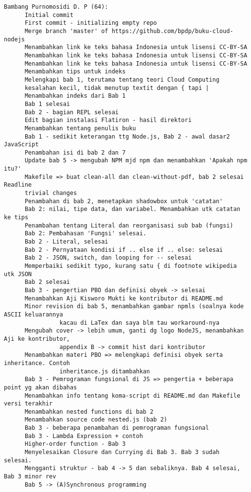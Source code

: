 \begin{lstlisting}
Bambang Purnomosidi D. P (64):
      Initial commit
      First commit - initializing empty repo
      Merge branch 'master' of https://github.com/bpdp/buku-cloud-nodejs
      Menambahkan link ke teks bahasa Indonesia untuk lisensi CC-BY-SA
      Menambahkan link ke teks bahasa Indonesia untuk lisensi CC-BY-SA
      Menambahkan link ke teks bahasa Indonesia untuk lisensi CC-BY-SA
      Menambahkan tips untuk indeks
      Melengkapi bab 1, terutama tentang teori Cloud Computing
      kesalahan kecil, tidak menutup textit dengan { tapi |
      Menambahkan indeks dari Bab 1
      Bab 1 selesai
      Bab 2 - bagian REPL selesai
      Edit bagian instalasi Flatiron - hasil direktori
      Menambahkan tentang penulis buku
      Bab 1 - sedikit keterangan ttg Node.js, Bab 2 - awal dasar2 JavaScript
      Penambahan isi di bab 2 dan 7
      Update bab 5 -> mengubah NPM mjd npm dan menambahkan 'Apakah npm itu?'
      Makefile => buat clean-all dan clean-without-pdf, bab 2 selesai Readline
      trivial changes
      Penambahan di bab 2, menetapkan shadowbox untuk 'catatan'
      Bab 2: nilai, tipe data, dan variabel. Menambahkan utk catatan ke tips
      Penambahan tentang Literal dan reorganisasi sub bab (fungsi)
      Bab 2: Pembahasan 'Fungsi' selesai.
      Bab 2 - Literal, selesai
      Bab 2 - Pernyataan kondisi if .. else if .. else: selesai
      Bab 2 - JSON, switch, dan looping for -- selesai
      Memperbaiki sedikit typo, kurang satu { di footnote wikipedia utk JSON
      Bab 2 selesai
      Bab 3 - pengertian PBO dan definisi obyek -> selesai
      Menambahkan Aji Kisworo Mukti ke kontributor di README.md
      Minor revision di bab 5, menambahkan gambar npmls (soalnya kode ASCII keluarannya 
				kacau di LaTex dan saya blm tau workaround-nya
      Mengubah cover -> lebih umum, ganti dg logo NodeJS, menambahkan Aji ke kontributor, 
				appendix B -> commit hist dari kontributor
      Menambahkan materi PBO => melengkapi definisi obyek serta inheritance. Contoh 
				inheritance.js ditambahkan
      Bab 3 - Pemrograman fungsional di JS => pengertia + beberapa point yg akan dibahas
      Menambahkan info tentang koma-script di README.md dan Makefile versi terakhir
      Menambahkan nested functions di bab 2
      Menambahkan source code nested.js (bab 2)
      Bab 3 - beberapa penambahan di pemrograman fungsional
      Bab 3 - Lambda Expression + contoh
      Higher-order function - Bab 3
      Menyelesaikan Closure dan Currying di Bab 3. Bab 3 sudah selesai.
      Mengganti struktur - bab 4 -> 5 dan sebaliknya. Bab 4 selesai, Bab 3 minor rev
      Bab 5 -> (A)Synchronous programming

\end{lstlisting}
